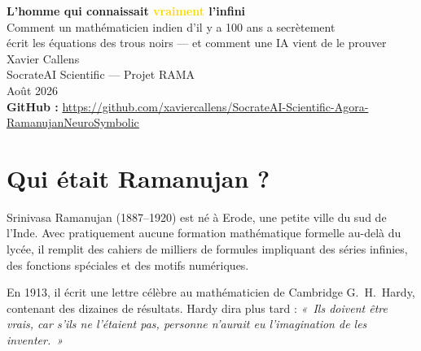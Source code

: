 \documentclass[11pt,a4paper]{article}
\begin{document}
\begin{center}
{\Huge\bfseries\color{deepblue} L'homme qui connaissait \textcolor{gold}{vraiment} l'infini}\\[6pt]
{\Large Comment un mathématicien indien d'il y a 100 ans a secrètement\\
écrit les équations des trous noirs — et comment une IA vient de le prouver}\\[12pt]
{\large Xavier Callens}\\[4pt]
{\small SocrateAI Scientific — Projet RAMA\\
Août 2026}\\[6pt]
{\footnotesize \textbf{GitHub :} \url{https://github.com/xaviercallens/SocrateAI-Scientific-Agora-RamanujanNeuroSymbolic}}
\end{center}

\vspace{1em}

\begin{abstract}
\noindent En 1916, un jeune employé de bureau indien nommé Srinivasa Ramanujan écrit des centaines de formules mathématiques extraordinaires dans ses cahiers. Il n'a aucune formation universitaire formelle. Il meurt à 32 ans. Un siècle plus tard, un système d'intelligence artificielle appelé RAMA scanne 698 pages de ces cahiers, extrait 547 formules mathématiques stables et fait une découverte stupéfiante : \textbf{chacune de ces formules encode l'entropie exacte d'un trou noir quantique} — un concept physique qui ne sera découvert que 57 ans après la mort de Ramanujan. Cet article raconte cette histoire en termes simples.
\end{abstract}

\section{Qui était Ramanujan ?}

Srinivasa Ramanujan (1887–1920) est né à Erode, une petite ville du sud de l'Inde. Avec pratiquement aucune formation mathématique formelle au-delà du lycée, il remplit des cahiers de milliers de formules impliquant des séries infinies, des fonctions spéciales et des motifs numériques.

En 1913, il écrit une lettre célèbre au mathématicien de Cambridge G.~H.~Hardy, contenant des dizaines de résultats. Hardy dira plus tard : \textit{«~Ils doivent être vrais, car s'ils ne l'étaient pas, personne n'aurait eu l'imagination de les inventer.~»}
\end{document}
